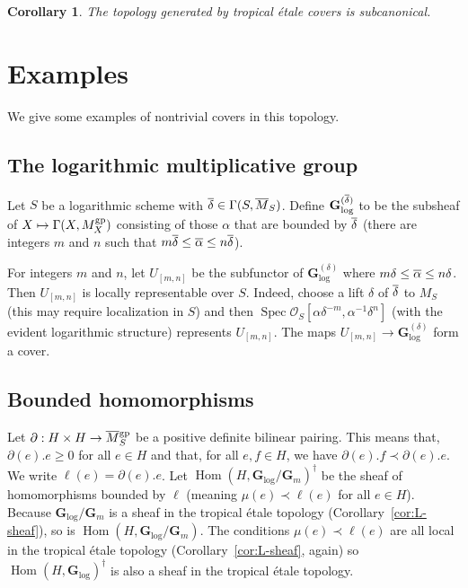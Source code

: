 \documentclass[12pt]{amsart}
\newtheorem{corollary}[theorem]{Corollary}
\theoremstyle{definition}
\theoremstyle{remark}
\def\Hom{\operatorname{Hom}}
\def\Spec{\operatorname{Spec}}
\def\logGm{\mathbf{G}_{\log}}
\def\Gm{\mathbf{G}_m}
\def\overnorm#1{\overline{#1}\vphantom{#1}}
\begin{document}
\begin{corollary}
The topology generated by tropical \'etale covers is subcanonical.
\end{corollary}

\section{Examples}

We give some examples of nontrivial covers in this topology.

\subsection{The logarithmic multiplicative group}

Let $S$ be a logarithmic scheme with $\overnorm\delta \in \Gamma(S, \overnorm M_S)$.  Define $\logGm^{(\overnorm\delta)}$ to be the subsheaf of $X \mapsto \Gamma(X, M_X^{\rm gp})$ consisting of those $\alpha$ that are bounded by $\overnorm\delta$ (there are integers $m$ and $n$ such that $m \overnorm\delta \leq \overnorm \alpha \leq n \overnorm\delta$).  

For integers $m$ and $n$, let $U_{[m,n]}$ be the subfunctor of $\logGm^{(\delta)}$ where $m \delta \leq \overnorm\alpha \leq n \delta$.  Then $U_{[m,n]}$ is locally representable over $S$.  Indeed, choose a lift $\delta$ of $\overnorm\delta$ to $M_S$ (this may require localization in $S$) and then $\Spec \mathcal O_S[\alpha \delta^{-m}, \alpha^{-1} \delta^n]$ (with the evident logarithmic structure) represents $U_{[m,n]}$.  The maps $U_{[m,n]} \to \logGm^{(\delta)}$ form a cover.

\subsection{Bounded homomorphisms}

Let $\partial : H \times H \to \overnorm M_S^{\rm gp}$ be a positive definite bilinear pairing.  This means that, $\partial(e).e \geq 0$ for all $e \in H$ and that, for all $e, f \in H$, we have $\partial(e) . f \prec \partial(e).e$.  We write $\ell(e) = \partial(e).e$.  Let $\Hom(H, \logGm/\Gm)^\dagger$ be the sheaf of homomorphisms bounded by $\ell$ (meaning $\mu(e) \prec \ell(e)$ for all $e \in H$).  Because $\logGm/\Gm$ is a sheaf in the tropical \'etale topology (Corollary~\ref{cor:L-sheaf}), so is $\Hom(H, \logGm/\Gm)$.  The conditions $\mu(e) \prec \ell(e)$ are all local in the tropical \'etale topology (Corollary~\ref{cor:L-sheaf}, again) so $\Hom(H, \logGm)^\dagger$ is also a sheaf in the tropical \'etale topology.
\end{document}

